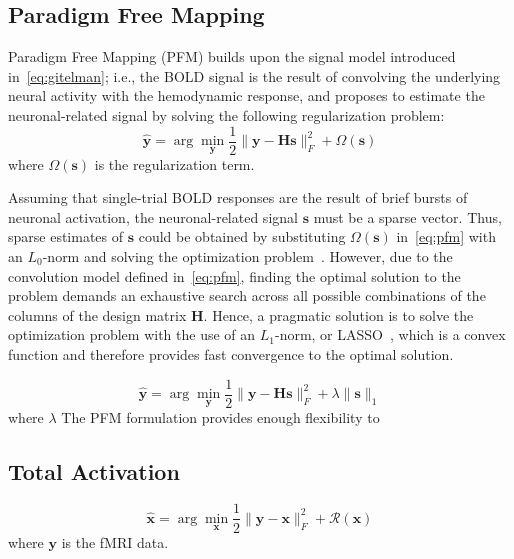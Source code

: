 \subsection{Paradigm Free Mapping}

Paradigm Free Mapping (PFM) builds upon the signal model introduced in~\eqref{eq:gitelman}; i.e., the BOLD signal is the result of convolving the underlying neural activity with the hemodynamic response, and proposes to estimate the neuronal-related signal by solving the following regularization problem:
\begin{equation}
    \label{eq:pfm}
    \hat{\mathbf{y}} = \arg \min_{\mathbf{y}} \frac{1}{2} \| \mathbf{y} - \mathbf{Hs} \|_F^2 + \Omega(\mathbf{s})
\end{equation}
where \(\Omega(\mathbf{s})\) is the regularization term.

Assuming that single-trial BOLD responses are the result of brief bursts of neuronal activation, the neuronal-related signal \(\mathbf{s}\) must be a sparse vector. Thus, sparse estimates of \(\mathbf{s}\) could be obtained by substituting \(\Omega(\mathbf{s})\) in~\eqref{eq:pfm} with an \(L_0\)-norm and solving the optimization problem~\cite{bruckstein2009sparse}. However, due to the convolution model defined in~\eqref{eq:pfm}, finding the optimal solution to the problem demands an exhaustive search across all possible combinations of the columns of the design matrix \(\mathbf{H}\). Hence, a pragmatic solution is to solve the optimization problem with the use of an \(L_1\)-norm, or LASSO~\cite{tibshirani1996regression}, which is a convex function and therefore provides fast convergence to the optimal solution.

\begin{equation}
    \label{eq:pfm}
    \hat{\mathbf{y}} = \arg \min_{\mathbf{y}} \frac{1}{2} \| \mathbf{y} - \mathbf{Hs} \|_F^2 + \lambda \| \mathbf{s} \|_1
\end{equation}
where \(\lambda\) 
The PFM formulation provides enough flexibility to 

\subsection{Total Activation}

\begin{equation}
    \hat{\mathbf{x}} = \arg \min_{\mathbf{x}} \frac{1}{2} \| \mathbf{y} - \mathbf{x} \|_F^2 + \mathcal{R}(\mathbf{x})
\end{equation}
where \(\mathbf{y}\) is the fMRI data.